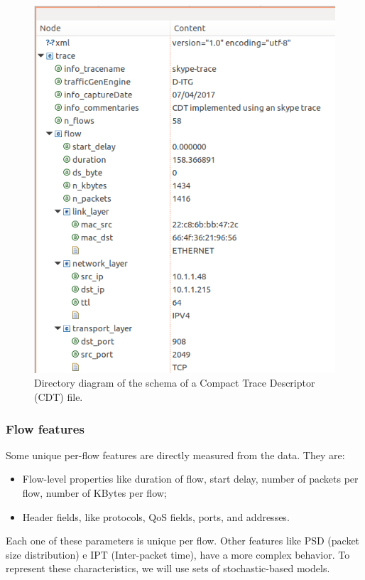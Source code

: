 \begin{figure}[ht!]
        \centering
        \includegraphics[width=\linewidth]{figures/cdt1}
        \caption{Directory diagram of the schema of a Compact Trace Descriptor (CDT) file.}
    \label{fig:CTD-diagram}
\end{figure}

\subsubsection{Flow features}

Some unique per-flow features are directly measured from the data. They are:  

\begin{itemize}
\item Flow-level properties like duration of flow, start delay, number of packets per flow, number of KBytes per flow; 
\item Header fields, like protocols, QoS fields, ports, and addresses.
\end{itemize}

Each one of these parameters is unique per flow. Other features like PSD (packet size distribution) e IPT (Inter-packet time), have a more complex behavior.  To represent these characteristics, we will use sets of stochastic-based models.  


